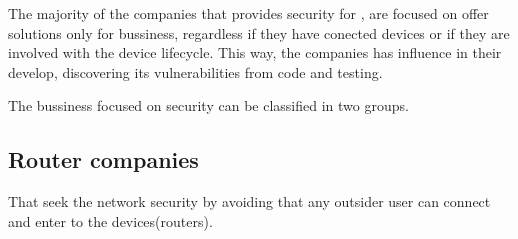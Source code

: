 

The majority of the companies that provides security for \IoT, are focused on offer solutions only for bussiness, regardless if they have conected devices or if they are involved with the device lifecycle. This way, the companies has influence in their develop, discovering its vulnerabilities from code and testing.

The bussiness focused on \IoT security can be classified in two groups. 

\subsection{Router companies}

That seek the network security by avoiding that any outsider user can connect and enter to the devices(routers).

